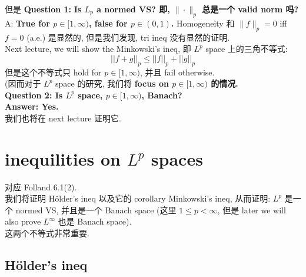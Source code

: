 \documentclass[lang=cn,11pt]{elegantbook}
\begin{document}
但是 \textbf{Question 1: }\textbf{Is $L_p$ a normed VS? 即, $\| \cdot\|_p$ 总是一个 valid norm 吗?}
A: \textbf{True for $p\in [1,\infty)$, false for $p\in (0,1)$.} 
Homogeneity 和 $\|f\|_p = 0$ iff $f = 0$ (a.e.) 是显然的, 但是我们发现, tri ineq 没有显然的证明.\\
Next lecture, we will show the Minkowski's ineq, 即 $L^p$ space 上的三角不等式:
\[
||f + g||_p \leq ||f||_p + ||g||_p
\]
但是这个不等式只 hold for $p\in [1,\infty)$, 并且 fail otherwise.\\
(因而对于 $L^p$ space 的研究, 我们将 \textbf{focus on $p \in [1,\infty)$ 的情况.}\\

\textbf{Question 2: Is $L^p$ space, $p\in [1,\infty)$, Banach?\\
Answer: Yes.}\\
我们也将在 next lecture 证明它.




\chapter{inequilities on $L^p$ spaces}
对应 Folland 6.1(2).\\
我们将证明 Hölder's ineq 以及它的 corollary Minkowski's ineq, 从而证明: $L^p$ 是一个 normed VS, 并且是一个 Banach space (这里 $1\leq p <\infty$, 但是 later we will also prove $L^\infty$ 也是 Banach space).\\
这两个不等式非常重要.

\section{Hölder's ineq}
\end{document}
